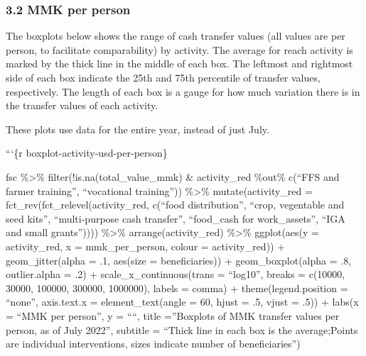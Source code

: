 \documentclass[
]{article}
\begin{document}
\hypertarget{mmk-per-person}{%
\subsubsection{3.2 MMK per person}\label{mmk-per-person}}

The boxplots below shows the range of cash transfer values (all values
are per person, to facilitate comparability) by activity. The average
for reach activity is marked by the thick line in the middle of each
box. The leftmost and rightmost side of each box indicate the 25th and
75th percentile of transfer values, respectively. The length of each box
is a gauge for how much variation there is in the transfer values of
each activity.

These plots use data for the entire year, instead of just July.

```\{r boxplot-activity-usd-per-person\}

fsc \%\textgreater\% filter(!is.na(total\_value\_mmk) \& activity\_red
\%out\% c(``FFS and farmer training'', ``vocational training''))
\%\textgreater\% mutate(activity\_red =
fct\_rev(fct\_relevel(activity\_red, c(``food distribution'', ``crop,
vegentable and seed kits'', ``multi-purpose cash transfer'',
``food\_cash for work\_assets'', ``IGA and small grants''))))
\%\textgreater\% arrange(activity\_red) \%\textgreater\% ggplot(aes(y =
activity\_red, x = mmk\_per\_person, colour = activity\_red)) +
geom\_jitter(alpha = .1, aes(size = beneficiaries)) +
geom\_boxplot(alpha = .8, outlier.alpha = .2) +
scale\_x\_continuous(trans = ``log10'', breaks = c(10000, 30000, 100000,
300000, 1000000), labels = comma) + theme(legend.position = ``none'',
axis.text.x = element\_text(angle = 60, hjust = .5, vjust = .5)) +
labs(x = ``MMK per person'', y = ````, title =''Boxplots of MMK transfer
values per person, as of July 2022'', subtitle = ``Thick line in each
box is the average;\n Points are individual interventions, sizes
indicate number of beneficiaries'')
\end{document}
